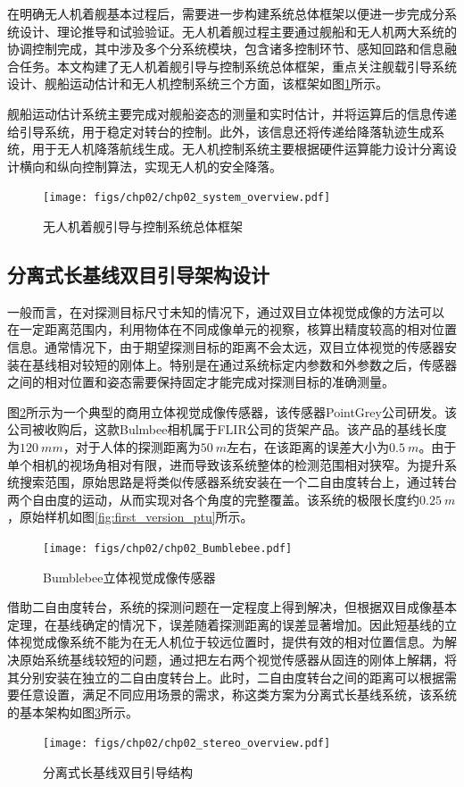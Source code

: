 在明确无人机着舰基本过程后，需要进一步构建系统总体框架以便进一步完成分系统设计、理论推导和试验验证。无人机着舰过程主要通过舰船和无人机两大系统的协调控制完成，其中涉及多个分系统模块，包含诸多控制环节、感知回路和信息融合任务。本文构建了无人机着舰引导与控制系统总体框架，重点关注舰载引导系统设计、舰船运动估计和无人机控制系统三个方面，该框架如图\ref{fig:chp02_system_overview}所示。

舰船运动估计系统主要完成对舰船姿态的测量和实时估计，并将运算后的信息传递给引导系统，用于稳定对转台的控制。此外，该信息还将传递给降落轨迹生成系统，用于无人机降落航线生成。无人机控制系统主要根据硬件运算能力设计分离设计横向和纵向控制算法，实现无人机的安全降落。

\begin{figure}[!b]
	\centering
	\texttt{[image: figs/chp02/chp02\_system\_overview.pdf]}	
	\caption{无人机着舰引导与控制系统总体框架}
	\label{fig:chp02_system_overview}
\end{figure}

\subsection{分离式长基线双目引导架构设计}
一般而言，在对探测目标尺寸未知的情况下，通过双目立体视觉成像的方法可以
在一定距离范围内，利用物体在不同成像单元的视察，核算出精度较高的相对位置信息。通常情况下，由于期望探测目标的距离不会太远，双目立体视觉的传感器安装在基线相对较短的刚体上。特别是在通过系统标定内参数和外参数之后，传感器之间的相对位置和姿态需要保持固定才能完成对探测目标的准确测量。

图\ref{fig:chp02_Bumblebee}所示为一个典型的商用立体视觉成像传感器，该传感器PointGrey公司研发。该公司被收购后，这款Bulmbee相机属于FLIR公司的货架产品。该产品的基线长度为$120\ mm$，对于人体的探测距离为$50\ m$左右，在该距离的误差大小为$0.5\ m$。由于单个相机的视场角相对有限，进而导致该系统整体的检测范围相对狭窄。为提升系统搜索范围，原始思路是将类似传感器系统安装在一个二自由度转台上，通过转台两个自由度的运动，从而实现对各个角度的完整覆盖。该系统的极限长度约$0.25\ m$，原始样机如图\ref{fig:first_version_ptu}所示。

\begin{figure}[!t]
	\centering
	\texttt{[image: figs/chp02/chp02\_Bumblebee.pdf]}	
	\caption{Bumblebee立体视觉成像传感器}
	\label{fig:chp02_Bumblebee}
\end{figure}

借助二自由度转台，系统的探测问题在一定程度上得到解决，但根据双目成像基本定理，在基线确定的情况下，误差随着探测距离的误差显著增加。因此短基线的立体视觉成像系统不能为在无人机位于较远位置时，提供有效的相对位置信息。为解决原始系统基线较短的问题，通过把左右两个视觉传感器从固连的刚体上解耦，将其分别安装在独立的二自由度转台上。此时，二自由度转台之间的距离可以根据需要任意设置，满足不同应用场景的需求，称这类方案为分离式长基线系统，该系统的基本架构如图\ref{fig:chp02_stereo_overview}所示。
\begin{figure}[!h]
	\centering
	\texttt{[image: figs/chp02/chp02\_stereo\_overview.pdf]}	
	\caption{分离式长基线双目引导结构}
	\label{fig:chp02_stereo_overview}
\end{figure}

